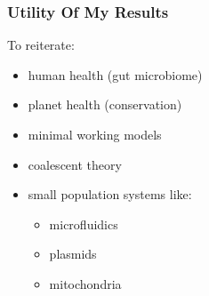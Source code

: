 \documentclass[dvipsnames]{beamer}
\begin{document}
\begin{frame}
\frametitle{Utility Of My Results}
\large{
	To reiterate:
	\begin{itemize}
		\item human health (gut microbiome)%
		\item planet health (conservation)%
		\item minimal working models
		\item coalescent theory%
		\item small population systems like:
		\begin{itemize}
			\item microfluidics
			\item plasmids
			\item mitochondria
		\end{itemize}
	\end{itemize}
}
\end{frame}

\end{document}
